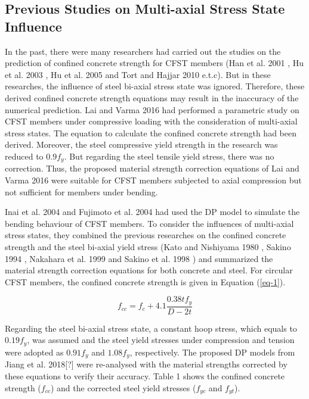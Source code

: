 \documentclass[12pt,a4]{article}
\begin{document}
	\subsection{Previous Studies on Multi-axial Stress State Influence}
	In the past, there were many researchers had carried out the studies on the prediction of confined concrete strength for CFST members (Han et al. 2001 \cite{RN23}, Hu et al. 2003 \cite{RN1}, Hu et al. 2005 \cite{RN29} and Tort and Hajjar 2010 \cite{RN46} e.t.c). But in these researches, the influence of steel bi-axial stress state was ignored. Therefore, these derived confined concrete strength equations may result in the inaccuracy of the numerical prediction. Lai and Varma 2016 \cite{RN32} had performed a parametric study on CFST members under compressive loading with the consideration of multi-axial stress states. The equation to calculate the confined concrete strength had been derived. Moreover, the steel compressive yield strength in the research was reduced to $0.9f_y$. But regarding the steel tensile yield stress, there was no correction. Thus, the proposed material strength correction equations of Lai and Varma 2016 \cite{RN32} were suitable for CFST members subjected to axial compression but not sufficient for members under bending.
	\par
	Inai et al. 2004 \cite{RN30} and Fujimoto et al. 2004 \cite{RN15} had used the DP model to simulate the bending behaviour of CFST members. To consider the influences of multi-axial stress states, they combined the previous researches on the confined concrete strength and the steel bi-axial yield stress (Kato and Nishiyama 1980 \cite{RN139}, Sakino 1994 \cite{RN138}, Nakahara et al. 1999 \cite{RN137} and Sakino et al. 1998 \cite{RN135}) and summarized the material strength correction equations for both concrete and steel. For circular CFST members, the confined concrete strength is given in Equation (\ref{eq-1}).
	\par
	\begin{equation}
	f_{cc} = f_c + 4.1 \frac{0.38tf_y}{D-2t}
	\label{eq-1}
	\end{equation}
	\par
	Regarding the steel bi-axial stress state, a constant hoop stress, which equals to $0.19f_y$, was assumed and the steel yield stresses under compression and tension were adopted as $0.91f_y$ and $1.08f_y$, respectively. The proposed DP models from Jiang et al. 2018[?] were re-analysed with the material strengths corrected by these equations to verify their accuracy. Table 1 shows the confined concrete strength ($f_{cc}$) and the corrected steel yield stresses ($f_{yc}$ and $f_{yt}$).
\end{document}
